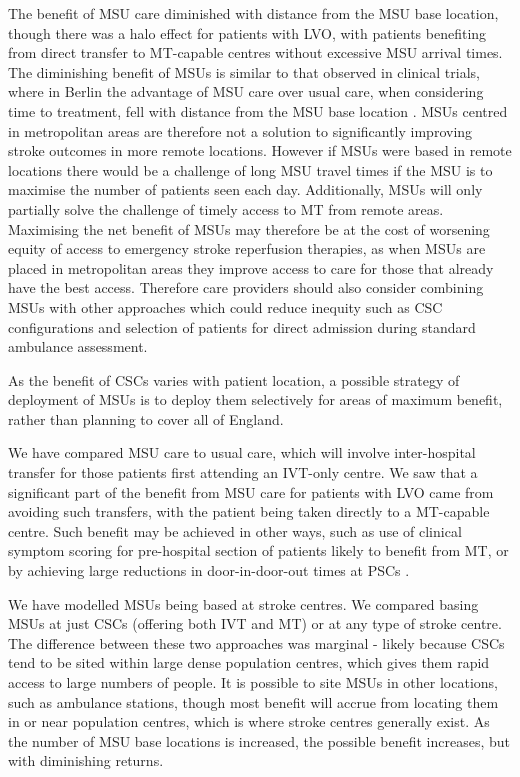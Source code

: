 The benefit of MSU care diminished with distance from the MSU base location, though there was a halo effect for patients with LVO, with patients benefiting from direct transfer to MT-capable centres without excessive MSU arrival times. The diminishing benefit of MSUs is similar to that observed in clinical trials, where in Berlin the advantage of MSU care over usual care, when considering time to treatment, fell with distance from the MSU base location \cite{koch_influence_2016}. MSUs centred in metropolitan areas are therefore not a solution to significantly improving stroke outcomes in more remote locations. However if MSUs were based in remote locations there would be a challenge of long MSU travel times if the MSU is to maximise the number of patients seen each day. Additionally, MSUs will only partially solve the challenge of timely access to MT from remote areas. Maximising the net benefit of MSUs may therefore be at the cost of worsening equity of access to emergency stroke reperfusion therapies, as when MSUs are placed in metropolitan areas they improve access to care for those that already have the best access. Therefore care providers should also consider combining MSUs with other approaches which could reduce inequity such as CSC configurations and selection of patients for direct admission during standard ambulance assessment. 

As the benefit of CSCs varies with patient location, a possible strategy of deployment of MSUs is to deploy them selectively for areas of maximum benefit, rather than planning to cover all of England.

We have compared MSU care to usual care, which will involve inter-hospital transfer for those patients first attending an IVT-only centre. We saw that a significant part of the benefit from MSU care for patients with LVO came from avoiding such transfers, with the patient being taken directly to a MT-capable centre. Such benefit may be achieved in other ways, such as use of clinical symptom scoring for pre-hospital section of patients likely to benefit from MT, or by achieving large reductions in door-in-door-out times at PSCs \cite{perez_de_la_ossa_effect_2022}.

We have modelled MSUs being based at stroke centres. We compared basing MSUs at just CSCs (offering both IVT and MT) or at any type of stroke centre. The difference between these two approaches was marginal - likely because CSCs tend to be sited within large dense population centres, which gives them rapid access to large numbers of people. It is possible to site MSUs in other locations, such as ambulance stations, though most benefit will accrue from locating them in or near population centres, which is where stroke centres generally exist. As the number of MSU base locations is increased, the possible benefit increases, but with diminishing returns. 


